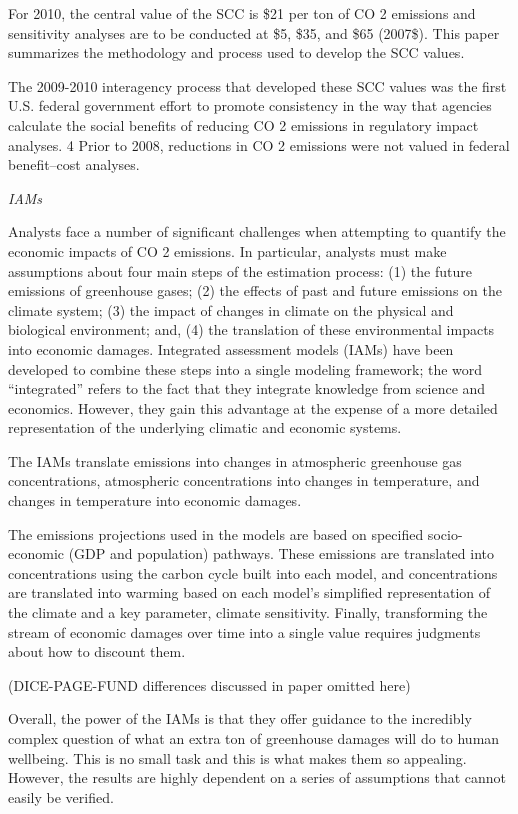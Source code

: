 \documentclass[
]{book}
\begin{document}
For 2010, the central value of the
SCC is \$21 per ton of CO 2 emissions and sensitivity analyses are to be conducted
at \$5, \$35, and \$65 (2007\$). This paper summarizes the methodology and
process used to develop the SCC values.

The 2009-2010 interagency process that developed these SCC values was the first U.S. federal
government effort to promote consistency in the way that agencies calculate the social benefits of
reducing CO 2 emissions in regulatory impact analyses. 4 Prior to 2008, reductions in CO 2
emissions were not valued in federal benefit--cost analyses.

\emph{IAMs}

Analysts face a number of significant challenges when attempting to quantify the economic
impacts of CO 2 emissions. In particular, analysts must make assumptions about four main steps
of the estimation process: (1) the future emissions of greenhouse gases; (2) the effects of past and
future emissions on the climate system; (3) the impact of changes in climate on the physical and
biological environment; and, (4) the translation of these environmental impacts into economic
damages. Integrated assessment models (IAMs) have been developed to combine these steps
into a single modeling framework; the word ``integrated'' refers to the fact that they integrate
knowledge from science and economics. However, they gain this advantage at the expense of a
more detailed representation of the underlying climatic and economic systems.

The IAMs translate emissions into changes in atmospheric greenhouse gas concentrations,
atmospheric concentrations into changes in temperature, and changes in temperature into
economic damages.

The emissions projections used in the models are based on specified socio-
economic (GDP and population) pathways. These emissions are translated into concentrations
using the carbon cycle built into each model, and concentrations are translated into warming
based on each model's simplified representation of the climate and a key parameter, climate
sensitivity. Finally, transforming the stream of economic damages over time into a single value
requires judgments about how to discount them.

(DICE-PAGE-FUND differences discussed in paper omitted here)

Overall, the power of the IAMs is that they offer guidance to the incredibly complex question of
what an extra ton of greenhouse damages will do to human wellbeing. This is no small task and
this is what makes them so appealing. However, the results are highly dependent on a series of
assumptions that cannot easily be verified.
\end{document}
